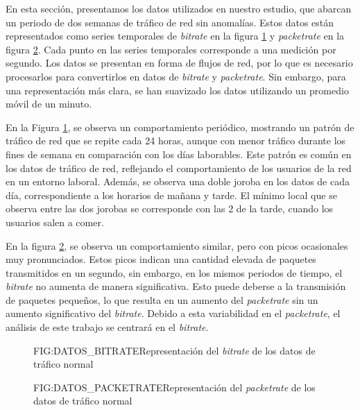 En esta sección, presentamos los datos utilizados en nuestro estudio, que abarcan un periodo de dos semanas de tráfico de red sin anomalías. Estos datos están representados como series temporales de \textit{bitrate} en la figura \ref{FIG:DATOS_BITRATE} y \textit{packetrate} en la figura \ref{FIG:DATOS_PACKETRATE}. Cada punto en las series temporales corresponde a una medición por segundo. Los datos se presentan en forma de flujos de red, por lo que es necesario procesarlos para convertirlos en datos de \textit{bitrate} y \textit{packetrate}. Sin embargo, para una representación más clara, se han suavizado los datos utilizando un promedio móvil de un minuto.

En la Figura \ref{FIG:DATOS_BITRATE}, se observa un comportamiento periódico, mostrando un patrón de tráfico de red que se repite cada 24 horas, aunque con menor tráfico durante los fines de semana en comparación con los días laborables. Este patrón es común en los datos de tráfico de red, reflejando el comportamiento de los usuarios de la red en un entorno laboral. Además, se observa una doble joroba en los datos de cada día, correspondiente a los horarios de mañana y tarde. El mínimo local que se observa entre las dos jorobas se corresponde con las 2 de la tarde, cuando los usuarios salen a comer.

En la figura \ref{FIG:DATOS_PACKETRATE}, se observa un comportamiento similar, pero con picos ocasionales muy pronunciados. Estos picos indican una cantidad elevada de paquetes transmitidos en un segundo, sin embargo, en los mismos periodos de tiempo, el \textit{bitrate} no aumenta de manera significativa. Esto
puede deberse a la transmisión de paquetes pequeños, lo que resulta en un aumento del \textit{packetrate} sin un aumento significativo del \textit{bitrate}.
Debido a esta variabilidad en el \textit{packetrate}, el análisis de este trabajo se centrará en el \textit{bitrate}.

\begin{figure}[Representación del \textit{bitrate} de los datos de tráfico normal]{FIG:DATOS_BITRATE}{Representación del \textit{bitrate} de los datos de tráfico normal}
    \label{FIG:DATOS_BITRATE}
\end{figure}

\begin{figure}[Representación del \textit{packetrate} de los datos de tráfico normal]{FIG:DATOS_PACKETRATE}{Representación del \textit{packetrate} de los datos de tráfico normal}
    \label{FIG:DATOS_PACKETRATE}
\end{figure}

